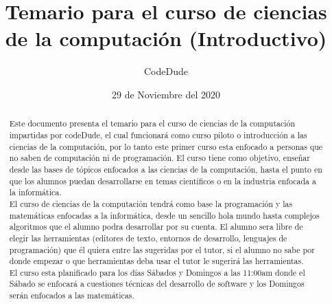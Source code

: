 \documentclass[12pt, letterpaper]{article}
\author{CodeDude}
\title{Temario para el curso de ciencias de la computación (Introductivo)}
\date{29 de Noviembre del 2020}
\begin{document}
\maketitle
\newpage
\begin{abstract}
Este documento presenta el temario para el curso de ciencias de la computación impartidas por codeDude, el cual funcionará como curso piloto o introducción
a las ciencias de la computación, por lo tanto este primer curso esta enfocado a personas que no saben de computación ni de  programación.
El curso tiene como objetivo, enseñar desde las bases de tópicos enfocados a las ciencias de la computación, hasta el punto en 
que los alumnos puedan desarrollarse en temas científicos
o en la industria enfocada a la informática.\\
El curso de ciencias de la computación tendrá como base la programación y las matemáticas enfocadas a la informática, desde un sencillo hola mundo
hasta complejos algoritmos que el alumno podra desarrollar por su cuenta. El alumno sera libre de elegir las herramientas (editores de texto, entornos de
desarrollo, lenguajes de programación) que él quiera entre las sugeridas por el tutor, si el alumno no sabe por donde empezar o que herramientas deba usar
el tutor le sugerirá las herramientas.\\
El curso esta planificado para los días Sábados y Domingos a las 11:00am donde el Sábado se enfocará a cuestiones técnicas del desarrollo de software y los
Domingos serán enfocados a las matemáticas.
\end{abstract}
\newpage
\end{document}
